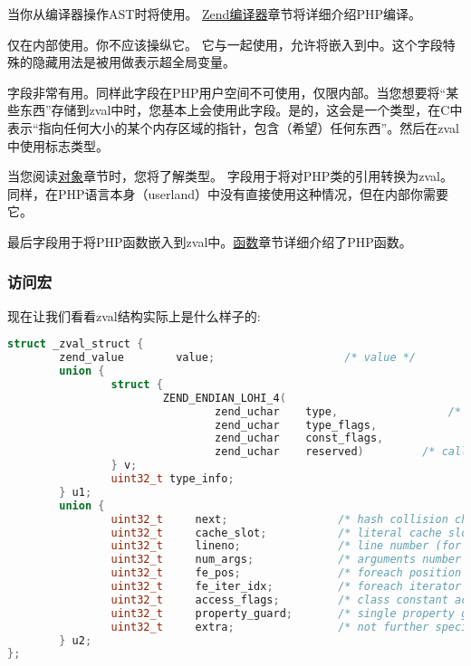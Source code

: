 当你从编译器操作AST时将使用。 \href{http://www.phpinternalsbook.com/php7/zend_engine/zend_compiler.html}{Zend编译器}章节将详细介绍PHP编译。

仅在内部使用。你不应该操纵它。 它与一起使用，允许将嵌入到中。这个字段特殊的隐藏用法是被用做表示超全局变量。

字段非常有用。同样此字段在PHP用户空间不可使用，仅限内部。当您想要将“某些东西”存储到zval中时，您基本上会使用此字段。是的，这会是一个类型，在C中表示“指向任何大小的某个内存区域的指针，包含（希望）任何东西”。然后在zval中使用标志类型。

当您阅读\href{http://www.phpinternalsbook.com/php7/internal_types/objects.html}{对象}章节时，您将了解类型。 字段用于将对PHP类的引用转换为zval。同样，在PHP语言本身（userland）中没有直接使用这种情况，但在内部你需要它。

最后字段用于将PHP函数嵌入到zval中。\href{http://www.phpinternalsbook.com/php7/internal_types/functions.html}{函数}章节详细介绍了PHP函数。

\subsubsection{访问宏}

现在让我们看看zval结构实际上是什么样子的:

\begin{lstlisting}[language=c]
struct _zval_struct {
        zend_value        value;                    /* value */
        union {
                struct {
                        ZEND_ENDIAN_LOHI_4(
                                zend_uchar    type,                 /* active type */
                                zend_uchar    type_flags,
                                zend_uchar    const_flags,
                                zend_uchar    reserved)         /* call info for EX(This) */
                } v;
                uint32_t type_info;
        } u1;
        union {
                uint32_t     next;                 /* hash collision chain */
                uint32_t     cache_slot;           /* literal cache slot */
                uint32_t     lineno;               /* line number (for ast nodes) */
                uint32_t     num_args;             /* arguments number for EX(This) */
                uint32_t     fe_pos;               /* foreach position */
                uint32_t     fe_iter_idx;          /* foreach iterator index */
                uint32_t     access_flags;         /* class constant access flags */
                uint32_t     property_guard;       /* single property guard */
                uint32_t     extra;                /* not further specified */
        } u2;
};
\end{lstlisting}

